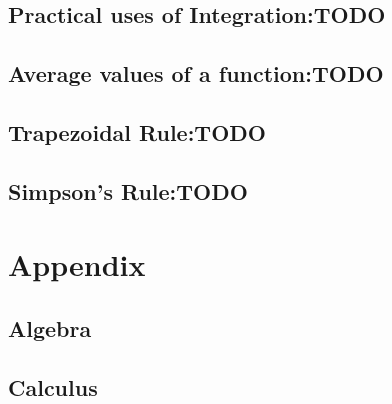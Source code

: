\section{Practical uses of Integration:TODO}
\label{sec:PracticalUsesOfIntegration}
\lipsum[1]
\section{Average values of a function:TODO}
\label{sec:AverageValuesOfAFunction}
\lipsum[1]
\section{Trapezoidal Rule:TODO}
\label{sec:TrapezoidalRule}
\lipsum[1]
\section{Simpson's Rule:TODO}
\label{sec:SimpsonsRule}
\lipsum[1]
\chapter{Appendix}
\label{chap:Appendix}
\section{Algebra}
\lipsum[1]
\section{Calculus}
\label{sec:AppCalculus}
%
